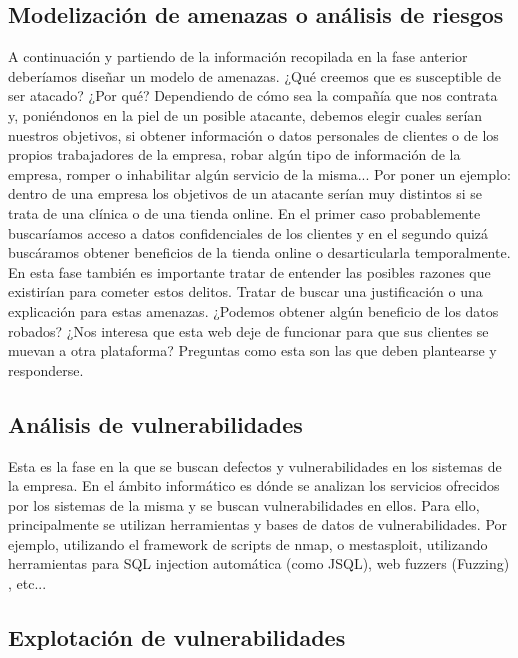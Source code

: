 \subsection{Modelización de amenazas o análisis de riesgos}

A continuación y partiendo de la información recopilada en la fase anterior deberíamos diseñar un modelo de amenazas. ¿Qué creemos que es susceptible de ser atacado? ¿Por qué? Dependiendo de cómo sea la compañía que nos contrata y, poniéndonos en la piel de un posible atacante, debemos elegir cuales serían nuestros objetivos, si obtener información o datos personales de clientes o de los propios trabajadores de la empresa, robar algún tipo de información de la empresa, romper o inhabilitar algún servicio de la misma... Por poner un ejemplo: dentro de una empresa los objetivos de un atacante serían muy distintos si se trata de una clínica o de una tienda online. En el primer caso probablemente buscaríamos acceso a datos confidenciales de los clientes y en el segundo quizá buscáramos obtener beneficios de la tienda online o desarticularla temporalmente. En esta fase también es importante tratar de entender las posibles razones que existirían para cometer estos delitos. Tratar de buscar una justificación o una explicación para estas amenazas. ¿Podemos obtener algún beneficio de los datos robados? ¿Nos interesa que esta web deje de funcionar para que sus clientes se muevan a otra plataforma? Preguntas como esta son las que deben plantearse y responderse.

\subsection{Análisis de vulnerabilidades}

Esta es la fase en la que se buscan defectos y vulnerabilidades en los sistemas de la empresa. En el ámbito informático es dónde se analizan los servicios ofrecidos por los sistemas de la misma y se buscan vulnerabilidades en ellos. Para ello, principalmente se utilizan herramientas y bases de datos de vulnerabilidades. Por ejemplo, utilizando el framework de scripts de nmap, o mestasploit, utilizando herramientas para SQL injection automática (como JSQL), web fuzzers (\Gls{Fuzzing}) , etc...


\subsection{Explotación de vulnerabilidades}

